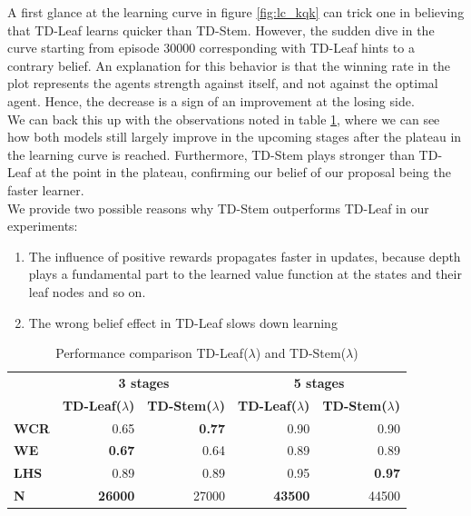 \documentclass[twocolumn]{phdsymp} %
\begin{document}
A first glance at the learning curve in figure \ref{fig:lc_kqk} can trick one in believing that TD-Leaf learns quicker than TD-Stem. However, the sudden dive in the curve starting from episode 30000 corresponding with TD-Leaf hints to a contrary belief. An explanation for this behavior is that the winning rate in the plot represents the agents strength against itself, and not against the optimal agent. Hence, the decrease is a sign of an improvement at the losing side.\\
We can back this up with the observations noted in table \ref{tab:perf_kqk}, where we can see how both models still largely improve in the upcoming stages after the plateau in the learning curve is reached. Furthermore, TD-Stem plays stronger than TD-Leaf at the point in the plateau, confirming our belief of our proposal being the faster learner.\\

We provide two possible reasons why TD-Stem outperforms TD-Leaf in our experiments:
\begin{enumerate}
\item The influence of positive rewards propagates faster in updates, because depth plays a fundamental part to the learned value function at the states and their leaf nodes and so on.
\item The wrong belief effect in TD-Leaf slows down learning
\end{enumerate}
\begin{table}[]
\centering
\caption{Performance comparison TD-Leaf($\lambda$) and TD-Stem($\lambda$)}
\label{tab:perf_kqk}
\begin{tabular}{l|rr|rr}
& \multicolumn{2}{c|}{\textbf{3 stages}} & \multicolumn{2}{c}{\textbf{5 stages}} \\

    &\multicolumn{1}{l}{\small\textbf{TD-Leaf($\lambda$)}} & \multicolumn{1}{l|}{\small\textbf{TD-Stem($\lambda$)}}&\multicolumn{1}{l}{\small\textbf{TD-Leaf($\lambda$)}} & \multicolumn{1}{l}{\small\textbf{TD-Stem($\lambda$)}} \\ \hline
\textbf{WCR} & 0.65 & \textbf{0.77} & 0.90                                  & 0.90                          \\
\textbf{WE} & \textbf{0.67} & 0.64 & 0.89                          & 0.89                                   \\
\textbf{LHS} & 0.89 & 0.89 & 0.95                                   & \textbf{0.97}                          \\
\textbf{N } & \textbf{26000} & 27000  & \textbf{43500}                                & 44500                      
\end{tabular}
\end{table}
\end{document}
